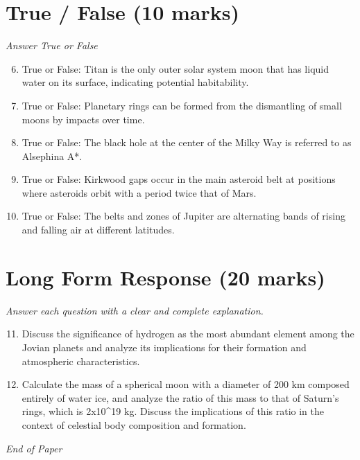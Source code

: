 \documentclass[12pt]{article}
\begin{document}
\section*{True / False (10 marks)}
\textit{Answer True or False}
\begin{enumerate}[label=\arabic*.]
\setcounter{enumi}{5}
\item True or False: Titan is the only outer solar system moon that has liquid water on its surface, indicating potential habitability.
\item True or False: Planetary rings can be formed from the dismantling of small moons by impacts over time.
\item True or False: The black hole at the center of the Milky Way is referred to as Alsephina A*.
\item True or False: Kirkwood gaps occur in the main asteroid belt at positions where asteroids orbit with a period twice that of Mars.
\item True or False: The belts and zones of Jupiter are alternating bands of rising and falling air at different latitudes.
\end{enumerate}

\section*{Long Form Response (20 marks)}
\textit{Answer each question with a clear and complete explanation.}
\begin{enumerate}[label=\arabic*.]
\setcounter{enumi}{10}
\item Discuss the significance of hydrogen as the most abundant element among the Jovian planets
and analyze its implications for their formation and atmospheric characteristics.
\item Calculate the mass of a spherical moon with a diameter of 200 km composed entirely of
water ice, and analyze the ratio of this mass to that of Saturn's rings, which is 2x10\^{}19
kg. Discuss the implications of this ratio in the context of celestial body composition
and formation.
\end{enumerate}

\vfill
\noindent\textit{End of Paper}
\end{document}
